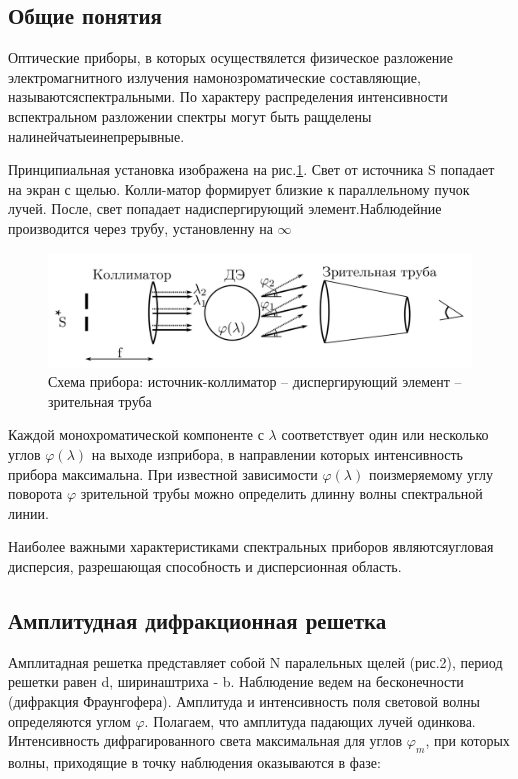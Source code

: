 \documentclass[a4paper]{article}
\begin{document}
\subsection{Общие понятия}
Оптические приборы, в которых осуществялется физическое разложение электромагнитного излучения намонозроматические составляющие, называютсяспектральными. По характеру распределения интенсивности вспектральном разложении спектры могут быть ращделены налинейчатыеинепрерывные. \par 
Принципиальная установка изображена на рис.\ref{p1}. Свет от источника S попадает на экран с щелью. Колли-матор формирует близкие к параллельному пучок лучей. После, свет попадает надиспергирующий элемент.Наблюдейние производится через трубу, установленну на $\infty$


\begin{figure}[H]
    \begin{center}
        \includegraphics[scale = 0.5]{p1.png}
        \caption{Схема прибора: источник-коллиматор – диспергирующий элемент – зрительная труба}
        \label{p1}
    \end{center}
\end{figure}

Каждой монохроматической компоненте с $\lambda$ соответствует один или несколько углов $\varphi(\lambda)$ на выходе изприбора, в направлении которых интенсивность прибора максимальна. При известной зависимости $\varphi(\lambda)$ поизмеряемому углу поворота $\varphi$ зрительной трубы можно определить длинну волны спектральной линии. \par 
Наиболее важными характеристиками спектральных приборов являютсяугловая дисперсия, разрешающая способность и дисперсионная область.


\subsection{Амплитудная дифракционная решетка}

Амплитадная решетка представляет собой N паралельных щелей (рис.2), период решетки равен d, ширинаштриха - b. Наблюдение ведем на бесконечности (дифракция Фраунгофера). Амплитуда и интенсивность поля
световой волны определяются углом $\varphi$. Полагаем, что амплитуда падающих лучей одинкова. Интенсивность дифрагированного света максимальная для углов $\varphi_m$, при которых волны, приходящие в точку наблюдения оказываются в фазе:
\end{document}
